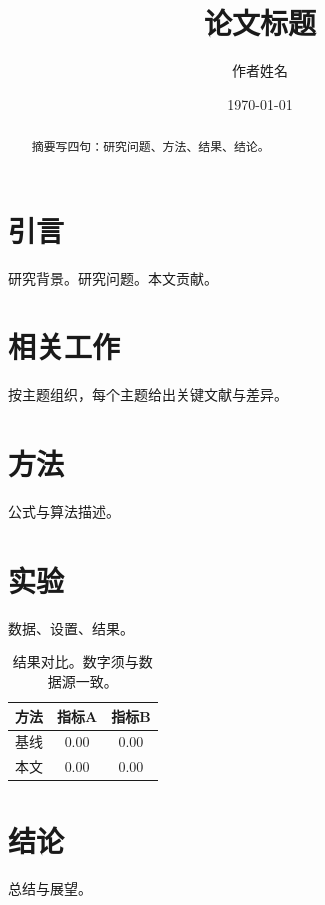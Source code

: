 \documentclass[11pt]{ctexart}
\title{论文标题}
\author{作者姓名}
\date{\today}
\begin{document}
\maketitle

\begin{abstract}
摘要写四句：研究问题、方法、结果、结论。
\end{abstract}

\section{引言}
研究背景。研究问题。本文贡献。

\section{相关工作}
按主题组织，每个主题给出关键文献与差异。

\section{方法}
\label{sec:method}
公式与算法描述。

\section{实验}
\label{sec:experiments}
数据、设置、结果。

\begin{table}[htbp]
\centering
\begin{tabular}{lcc}
\toprule
方法 & 指标A & 指标B \\
\midrule
基线 & 0.00 & 0.00 \\
本文 & 0.00 & 0.00 \\
\bottomrule
\end{tabular}
\caption{结果对比。数字须与数据源一致。}
\label{tab:results}
\end{table}

\section{结论}
\label{sec:conclusion}
总结与展望。



\end{document}
